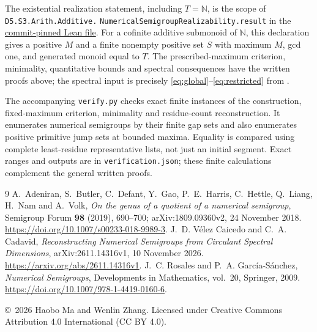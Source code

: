\documentclass[11pt]{article}
\newcommand{\N}{\mathbb N}
\begin{document}
The existential realization statement, including $T=\N$, is the scope of
\texttt{D5.S3.Arith.Additive.}\allowbreak
\texttt{NumericalSemigroupRealizability.result} in the
\href{https://github.com/the-omega-institute/trureturing/blob/8acf7efa41af7fc9ddbbd39571e7ef73462f4509/D5/S3/Arith/Additive/NumericalSemigroupRealizability.lean}{commit-pinned Lean file}.
For a cofinite additive submonoid of $\N$, this declaration gives a
positive $M$ and a finite nonempty positive set $S$ with maximum $M$,
gcd one, and generated monoid equal to $T$.
The prescribed-maximum criterion, minimality, quantitative bounds and
spectral consequences have the written proofs above; the spectral input
is precisely \eqref{eq:global}--\eqref{eq:restricted} from \cite{VC}.

The accompanying \texttt{verify.py} checks exact finite instances of the
construction, fixed-maximum criterion, minimality and residue-count
reconstruction. It enumerates numerical semigroups by their finite gap
sets and also enumerates positive primitive jump sets at bounded maxima.
Equality is compared using complete least-residue representative lists,
not just an initial segment. Exact ranges and outputs are in
\texttt{verification.json}; these finite calculations complement the
general written proofs.

\begin{thebibliography}{9}
A.~Adeniran, S.~Butler, C.~Defant, Y.~Gao, P.~E.~Harris, C.~Hettle,
Q.~Liang, H.~Nam and A.~Volk,
\emph{On the genus of a quotient of a numerical semigroup},
Semigroup Forum \textbf{98} (2019), 690--700;
arXiv:1809.09360v2, 24 November 2018.
\url{https://doi.org/10.1007/s00233-018-9989-3}.
J.~D. V\'elez Caicedo and C.~A. Cadavid,
\emph{Reconstructing Numerical Semigroups from Circulant Spectral Dimensions},
arXiv:2611.14316v1, 10 November 2026.
\url{https://arxiv.org/abs/2611.14316v1}.
J.~C. Rosales and P.~A. Garc\'ia-S\'anchez,
\emph{Numerical Semigroups}, Developments in Mathematics, vol.~20,
Springer, 2009.
\url{https://doi.org/10.1007/978-1-4419-0160-6}.
\end{thebibliography}
\medskip\noindent\small
\copyright\ 2026 Haobo Ma and Wenlin Zhang.
Licensed under Creative Commons Attribution 4.0 International (CC BY 4.0).
\end{document}
